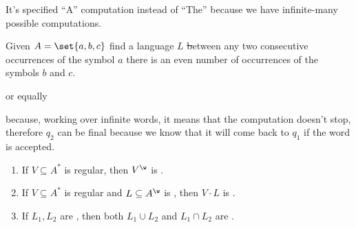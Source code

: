 \documentclass[oneside]{academica}
\begin{document}
\begin{note}
  It's specified ``A'' computation instead of ``The'' because we have infinite-many possible computations.
\end{note}

\begin{example*}
  Given $A = \set{a, b, c}$ find a language $L$ \st between any two consecutive occurrences of the symbol $a$ there is an even number of occurrences of the symbols $b$ and $c$.
  \begin{center}
    
  \end{center}
  or equally
  \begin{center}
    
  \end{center}
  because, working over infinite words, it means that the computation doesn't stop, therefore $q_2$ can be final because we know that it will come back to $q_1$ if the word is accepted.
\end{example*}

\begin{theorem*}
  \begin{enumerate}
    \item If $V \subseteq A^*$ is regular, then $V^\w$ is \wreg.
    \item If $V \subseteq A^*$ is regular and $L \subseteq \Aw$ is \wreg, then $V \cdot L$ is \wreg.
    \item If $L_1, L_2$ are \wreg, then both $L_1 \cup L_2$ and $L_1 \cap L_2$ are \wreg.
  \end{enumerate}
\end{theorem*}
\end{document}
